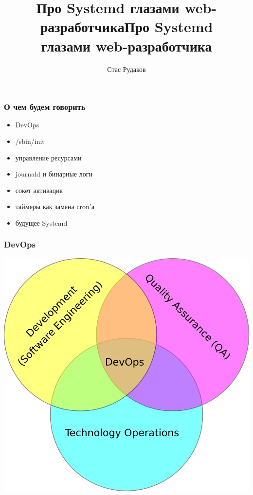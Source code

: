 \documentclass[aspectratio=169]{beamer}
\begin{document}
\title{Про Systemd глазами web-разработчика}
\author{Стас Рудаков}
\date{}

{
\title{Про Systemd\\глазами web-разработчика}
\titleframe
}


\begin{frame}
  \frametitle{О чем будем говорить}
  \begin{itemize}
    \item DevOps
    \item /sbin/init
    \item управление ресурсами
    \item journald и бинарные логи
    \item сокет активация
    \item таймеры как замена cron'а
    \item будущее Systemd
  \end{itemize}
\end{frame}


\begin{frame}
  \frametitle{DevOps}
  \begin{center}
    \includegraphics[scale=0.66]{img2/Devops.png}
  \end{center}
\end{frame}
\end{document}
